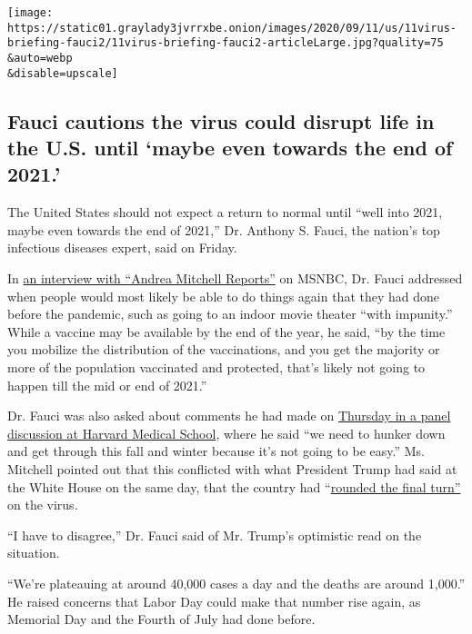 \texttt{[image: https://static01.graylady3jvrrxbe.onion/images/2020/09/11/us/11virus-briefing-fauci2/11virus-briefing-fauci2-articleLarge.jpg?quality=75\\\&auto=webp\\\&disable=upscale]}

\hypertarget{fauci-cautions-the-virus-could-disrupt-life-in-the-us-until-maybe-even-towards-the-end-of-2021}{%
\subsection{Fauci cautions the virus could disrupt life in the U.S.
until `maybe even towards the end of
2021.'}\label{fauci-cautions-the-virus-could-disrupt-life-in-the-us-until-maybe-even-towards-the-end-of-2021}}

The United States should not expect a return to normal until ``well into
2021, maybe even towards the end of 2021,'' Dr. Anthony S. Fauci, the
nation's top infectious diseases expert, said on Friday.

In
\href{https://www.nbcnews.com/health/health-news/fauci-says-us-won-t-get-back-normal-until-late-n1239882}{an
interview with ``Andrea Mitchell Reports''} on MSNBC, Dr. Fauci
addressed when people would most likely be able to do things again that
they had done before the pandemic, such as going to an indoor movie
theater ``with impunity.'' While a vaccine may be available by the end
of the year, he said, ``by the time you mobilize the distribution of the
vaccinations, and you get the majority or more of the population
vaccinated and protected, that's likely not going to happen till the mid
or end of 2021.''

Dr. Fauci was also asked about comments he had made on
\href{https://partners.mediasite.com/mediasite/Play/968f633a874c4f1a80c368496f49d4661d}{Thursday
in a panel discussion at Harvard Medical School}, where he said ``we
need to hunker down and get through this fall and winter because it's
not going to be easy.'' Ms. Mitchell pointed out that this conflicted
with what President Trump had said at the White House on the same day,
that the country had
``\href{https://www.whitehouse.gov/briefings-statements/remarks-president-trump-press-briefing-091020/}{rounded
the final turn''} on the virus.

``I have to disagree,'' Dr. Fauci said of Mr. Trump's optimistic read on
the situation.

``We're plateauing at around 40,000 cases a day and the deaths are
around 1,000.'' He raised concerns that Labor Day could make that number
rise again, as Memorial Day and the Fourth of July had done before.


